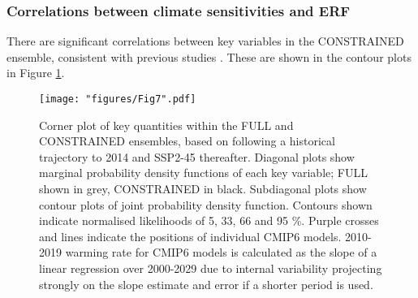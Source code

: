 \documentclass[gmd, manuscript]{copernicus}
\begin{document}
\subsubsection{Correlations between climate sensitivities and ERF}
There are significant correlations between key variables in the CONSTRAINED ensemble, consistent with previous studies \citep{Smith2018,Millar2015,Sanderson2020a,Forest2002,Marvel2016}. These are shown in the contour plots in Figure \ref{fig:NROY_corr}.
\pagebreak
\begin{figure}[t]
    \texttt{[image: "figures/Fig7".pdf]}
    \caption{Corner plot of key quantities within the FULL and CONSTRAINED ensembles, based on following a historical trajectory to 2014 and SSP2-45 thereafter. Diagonal plots show marginal probability density functions of each key variable; FULL shown in grey, CONSTRAINED in black. Subdiagonal plots show contour plots of joint probability density function. Contours shown indicate normalised likelihoods of 5, 33, 66 and 95 \%. Purple crosses and lines indicate the positions of individual CMIP6 models. 2010-2019 warming rate for CMIP6 models is calculated as the slope of a linear regression over 2000-2029 due to internal variability projecting strongly on the slope estimate and error if a shorter period is used.}
    \label{fig:NROY_corr}
\end{figure}
\clearpage
%
\end{document}
